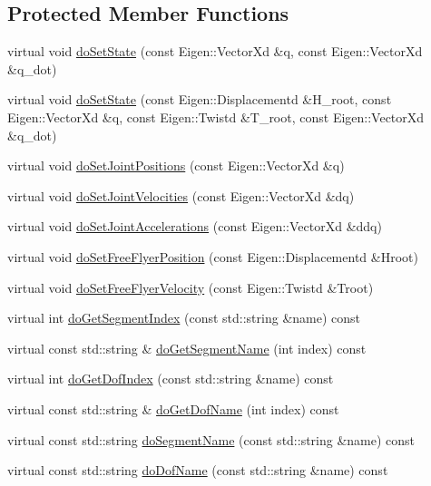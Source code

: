 \subsection*{\-Protected \-Member \-Functions}
\begin{DoxyCompactItemize}
\item 
virtual void \hyperlink{classocra__icub_1_1OcraWbiModel_a8639b19a514624953e5e58dbde1c8227}{do\-Set\-State} (const \-Eigen\-::\-Vector\-Xd \&q, const \-Eigen\-::\-Vector\-Xd \&q\-\_\-dot)
\item 
virtual void \hyperlink{classocra__icub_1_1OcraWbiModel_a411c844cbde565ed54a224e39a2e65c1}{do\-Set\-State} (const \-Eigen\-::\-Displacementd \&\-H\-\_\-root, const \-Eigen\-::\-Vector\-Xd \&q, const \-Eigen\-::\-Twistd \&\-T\-\_\-root, const \-Eigen\-::\-Vector\-Xd \&q\-\_\-dot)
\item 
virtual void \hyperlink{classocra__icub_1_1OcraWbiModel_a64d40044dff11a6302992d52f1dbde0d}{do\-Set\-Joint\-Positions} (const \-Eigen\-::\-Vector\-Xd \&q)
\item 
virtual void \hyperlink{classocra__icub_1_1OcraWbiModel_a26a758c5ecb02601c066bdfffe5db194}{do\-Set\-Joint\-Velocities} (const \-Eigen\-::\-Vector\-Xd \&dq)
\item 
virtual void \hyperlink{classocra__icub_1_1OcraWbiModel_abbf82fedd5a856983dbf6c444dda33d9}{do\-Set\-Joint\-Accelerations} (const \-Eigen\-::\-Vector\-Xd \&ddq)
\item 
virtual void \hyperlink{classocra__icub_1_1OcraWbiModel_aa2bb481dc7fdb55c363ac1a404a807e5}{do\-Set\-Free\-Flyer\-Position} (const \-Eigen\-::\-Displacementd \&\-Hroot)
\item 
virtual void \hyperlink{classocra__icub_1_1OcraWbiModel_af740a36f6cc2899dcd6f3507b9703c7f}{do\-Set\-Free\-Flyer\-Velocity} (const \-Eigen\-::\-Twistd \&\-Troot)
\item 
virtual int \hyperlink{classocra__icub_1_1OcraWbiModel_ad6a498c6c66d6145b99e91bc631efb77}{do\-Get\-Segment\-Index} (const std\-::string \&name) const 
\item 
virtual const std\-::string \& \hyperlink{classocra__icub_1_1OcraWbiModel_a6a2231f2baece1608297aa3a256edb79}{do\-Get\-Segment\-Name} (int index) const 
\item 
virtual int \hyperlink{classocra__icub_1_1OcraWbiModel_a88842af1291a413848fc500554b12a36}{do\-Get\-Dof\-Index} (const std\-::string \&name) const 
\item 
virtual const std\-::string \& \hyperlink{classocra__icub_1_1OcraWbiModel_ac4ba9f8c3964d3f043543c8196fee185}{do\-Get\-Dof\-Name} (int index) const 
\item 
virtual const std\-::string \hyperlink{classocra__icub_1_1OcraWbiModel_adfe5a0f1fb82248f8cbf309f88a95e6c}{do\-Segment\-Name} (const std\-::string \&name) const 
\item 
virtual const std\-::string \hyperlink{classocra__icub_1_1OcraWbiModel_a3c6be0fe7bb4f205f9fd6a44bb275fc2}{do\-Dof\-Name} (const std\-::string \&name) const 
\end{DoxyCompactItemize}
